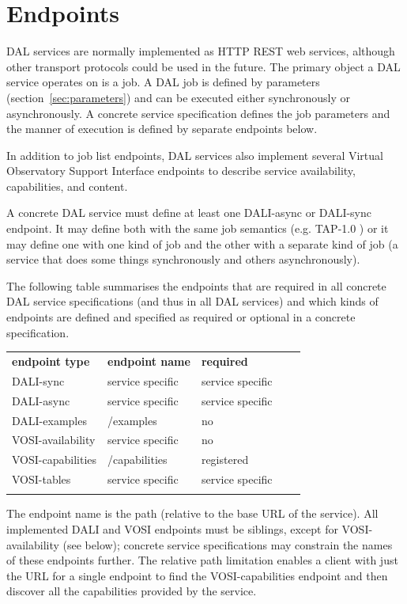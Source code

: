 \documentclass[11pt,letter]{ivoa}
\begin{document}
\section{Endpoints}
\label{sec:endpoints}
DAL services are normally implemented as HTTP REST \citep{fielding00}
web services, although
other transport protocols could be used in the future. The primary object
a DAL service operates on is a job. A DAL job is defined by parameters
(section~\ref{sec:parameters}) and
can be executed either synchronously or asynchronously. A concrete service
specification defines the job parameters and the manner of execution is defined
by separate endpoints below.

In addition to job list endpoints, DAL services also implement several Virtual
Observatory Support Interface \citep{2017ivoa.spec.0524G} endpoints to describe
service availability, capabilities, and content.

A concrete DAL service must define at least one DALI-async or DALI-sync
endpoint. It may define both with the same job semantics (e.g. TAP-1.0
\citep{2010ivoa.spec.0327D}) or it may define one with one kind of job and the other with a
separate kind of job (a service that does some things synchronously and others
asynchronously).

The following table summarises the endpoints that are required in all concrete
DAL service specifications (and thus in all DAL services) and which kinds of
endpoints are defined and specified as required or optional in a concrete
specification.


\begin{tabular}{l l l l l}
\sptablerule
\textbf{endpoint type} & \textbf{endpoint name} & \textbf{required} \\
\sptablerule
DALI-sync & service specific & service specific & \\
DALI-async & service specific & service specific & \\
DALI-examples & /examples & no & \\
VOSI-availability & service specific & no & \\
VOSI-capabilities & /capabilities & registered & \\
VOSI-tables & service specific & service specific & \\
\sptablerule
\label{tab:endpoints}
\end{tabular}

The endpoint name is the path (relative to the base URL of the service). All implemented
DALI and VOSI endpoints must be siblings, except for VOSI-availability (see below);
concrete service specifications may constrain the names of these endpoints further.
The relative path limitation enables a client with just the URL for a single endpoint to
find the VOSI-capabilities endpoint and then discover all the capabilities
provided by the service.
\end{document}

